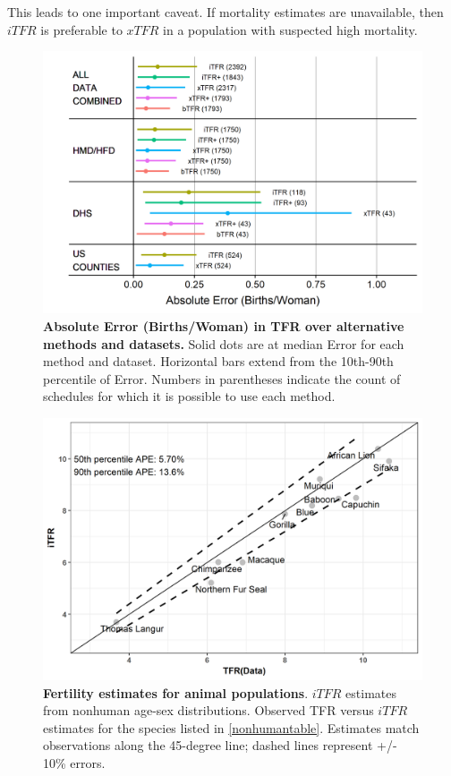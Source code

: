 \documentclass[12pt]{article}
\begin{document}
This leads to one important caveat. If mortality estimates are
unavailable, then \(iTFR\) is preferable to \(xTFR\) in a population
with suspected high mortality.

\begin{figure}
\centering
\includegraphics{manuscript_files/figure-latex/plot-comparisons-over-all-data-1.png}
\caption{\textbf{Absolute Error (Births/Woman) in TFR over alternative
methods and datasets.} Solid dots are at median Error for each method
and dataset. Horizontal bars extend from the 10th-90th percentile of
Error. Numbers in parentheses indicate the count of schedules for which
it is possible to use each method. \label{comparison}}
\end{figure}

\begin{figure}

{\centering \includegraphics[width=0.6\linewidth]{manuscript_files/figure-latex/plot-nonhuman-estimates-1} 

}

\caption{\textbf{Fertility estimates for animal populations}. $iTFR$ estimates from nonhuman age-sex distributions. Observed TFR versus $iTFR$ estimates for the species listed in \autoref{nonhumantable}. Estimates match observations along the 45-degree line; dashed lines represent +/- 10\% errors.\label{primates}}\label{fig:plot-nonhuman-estimates}
\end{figure}
\end{document}
